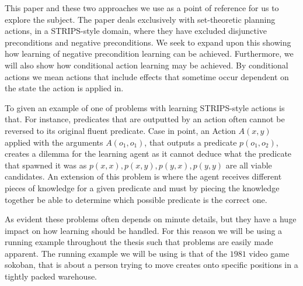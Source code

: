\documentclass[Master.tex]{subfiles}
\begin{document}
	This paper and these two approaches we use as a point of reference for us to explore the subject.  The paper deals exclusively with set-theoretic planning actions, in a STRIPS-style domain, where they have excluded disjunctive preconditions and negative preconditions. 
	We seek to expand upon this showing how learning of negative precondition learning can be achieved. Furthermore, we will also show how conditional action learning may be achieved. By conditional actions we mean actions that include effects that sometime occur dependent on the state the action is applied in.
	
	
	To given an example of one of problems with learning STRIPS-style actions is that. For instance, predicates that are outputted by an action often cannot be reversed to its original fluent predicate. Case in point, an Action $A(x,y)$ applied with the arguments $A(o_1,o_1)$, that outputs a predicate $p(o_1,o_2)$, creates a dilemma for the learning agent as it cannot deduce what the predicate that spawned it was as $p(x,x), p(x,y), p(y,x), p(y,y)$ are all viable candidates. An extension of this problem is where the agent receives different pieces of knowledge for a given predicate and must by piecing the knowledge together be able to determine which possible predicate is the correct one.
	
	As evident these problems often depends on minute details, but they have a huge impact on how learning should be handled. For this reason we will be using a running example throughout the thesis such that problems are easily made apparent. The running example we will be using is that of the $1981$ video game sokoban, that is about a person trying to move creates onto specific positions in a tightly packed warehouse.
	
\end{document}
